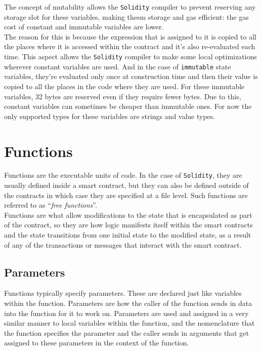 The concept of mutability allows the \texttt{Solidity} compiler to prevent reserving any storage slot for these variables, making thesm storage and gas efficient: the gas cost of constant and immutable variables are lower.\\

The reason for this is because the expression that is assigned to it is copied to all the places where it is accessed within the contract and it's also re-evaluated each time.
This aspect allows the \texttt{Solidity} compiler to make some local optimizations wherever constant variables are used.
And in the case of \texttt{immutable} state variables, they're evaluated only once at construction time and then their value is copied to all the places in the code where they are used.
For these immutable variables, 32 bytes are reserved even if they require fewer bytes.
Due to this, constant variables can sometimes be cheaper than immutable ones.
For now the only supported types for these variables are strings and value types.

\section{Functions}

Functions are the executable units of code.
In the case of \texttt{Solidity}, they are usually defined inside a smart contract, but they can also be defined outside of the contracts in which case they are specified at a file level.
Such functions are referred to as ``\textit{free functions}''.\\

Functions are what allow modifications to the state that is encapsulated as part of the contract, so they are how logic manifests itself within the smart contracts and the state transitions from one initial state to the modified state, as a result of any of the transactions or messages that interact with the smart contract.

\subsection*{Parameters}

Functions typically specify parameters.
These are declared just like variables within the function. 
Parameters are how the caller of the function sends in data into the function for it to work on.
Parameters are used and assigned in a very similar manner to local variables within the function, and the nomenclature that the function specifies the parameter and the caller sends in arguments that get assigned to these parameters in the context of the function.

